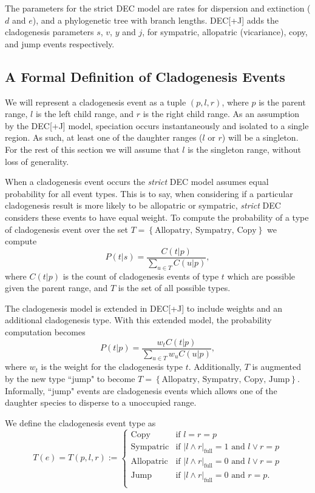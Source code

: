 \documentclass[a4paper]{article}
\newcommand{\CountFull}[1]{|#1|_\text{full}}
\newcommand{\decj}{DEC[+J]}
\newcommand{\rand}[2]{#1 \land #2}
\newcommand{\ror}[2]{#1 \lor #2}
\begin{document}
The parameters for the strict DEC model are rates for dispersion and extinction ($d$ and $e$), and a phylogenetic tree
with branch lengths. 
\decj{} adds the cladogenesis parameters $s$, $v$, $y$ and $j$, for sympatric, allopatric (vicariance), copy, and jump
events respectively.

\subsection{A Formal Definition of Cladogenesis Events}
\label{sec:formal-cladogenesis}

We will represent a cladogenesis event as a tuple $(p, l, r)$, where $p$ is the parent range, $l$ is the left child
range, and $r$ is the right child range.
As an assumption by the DEC[+J] model, speciation occurs instantaneously and isolated to a single region.
As such, at least one of the daughter ranges ($l$ or $r$) will be a singleton.
For the rest of this section we will assume that $l$ is the singleton range, without loss of generality.

When a cladogenesis event occurs the \textit{strict} DEC model assumes equal probability for all event types.
This is to say, when considering if a particular cladogenesis result is more likely to be allopatric or sympatric,
\textit{strict} DEC considers these events to have equal weight.
To compute the probability of a type of cladogenesis event over the set \(T = \left\{\text{Allopatry, Sympatry,
Copy}\right\}\) we compute
\[
	P(t |
	s) = \frac{C(t | p)}{\sum_{u \in T} C(u | p)},
\]
where \( C(t|p) \) is the count of cladogenesis events of type $t$ which are possible given the parent range, and $T$ is
the set of all possible types.

The cladogenesis model is extended in \decj{} to include weights and an additional cladogenesis type.
With this extended model, the probability computation becomes
\begin{equation}
	P(t | p) = \frac{w_t C(t | p)}{\sum_{u \in T} w_u C(u | p)},
\end{equation}
where $w_t$ is the weight for the cladogenesis type $t$.
Additionally, $T$ is augmented by the new type ``jump" to become \(T = \left\{\text{Allopatry, Sympatry, Copy,
Jump}\right\} \).
Informally, ``jump" events are cladogenesis events which allows one of the daughter species to disperse to a unoccupied
range.

We define the cladogenesis event type as
\begin{equation}
T(e) = T(p, l, r) := 
\begin{cases}
  \text{Copy} & \text{if }l = r = p \\ 
  \text{Sympatric} & \text{if } \CountFull{\rand{l}{r}} = 1 \text{ and } \ror{l}{r} = p \\ 
  \text{Allopatric} & \text{if } \CountFull{\rand{l}{r}} = 0 \text{ and } \ror{l}{r} = p   \\ 
  \text{Jump} & \text{if } \CountFull{\rand{l}{r}} = 0 \text{ and } r = p. \\ 
\end{cases}
\label{eq:clad-test}
\end{equation}
\end{document}
